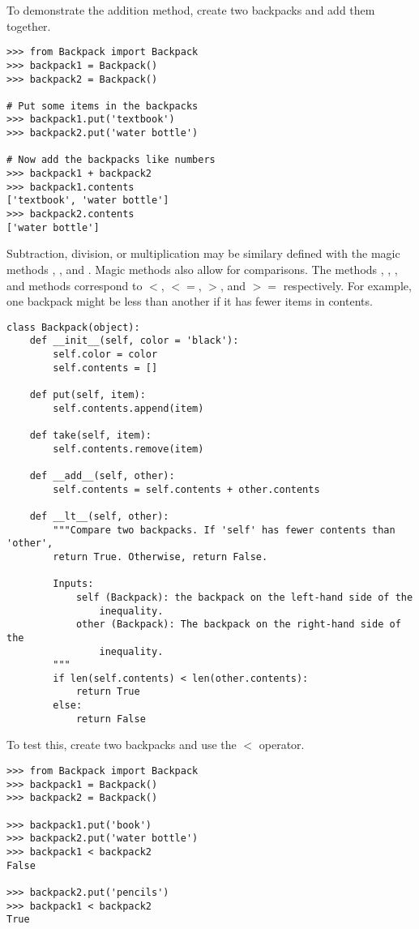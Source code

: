 To demonstrate the addition method, create two backpacks and add them together.

\begin{lstlisting}
>>> from Backpack import Backpack
>>> backpack1 = Backpack()
>>> backpack2 = Backpack()

# Put some items in the backpacks
>>> backpack1.put('textbook')
>>> backpack2.put('water bottle')

# Now add the backpacks like numbers
>>> backpack1 + backpack2
>>> backpack1.contents
['textbook', 'water bottle']
>>> backpack2.contents
['water bottle']
\end{lstlisting}

Subtraction, division, or multiplication may be similary defined with the magic methods , , and .
Magic methods also allow for comparisons.
The methods , , , and  methods correspond to $<$, $<=$, $>$, and $>=$ respectively.
For example, one backpack might be less than another if it has fewer items in contents.

\begin{lstlisting}
class Backpack(object):
    def __init__(self, color = 'black'):
        self.color = color
        self.contents = []
    
    def put(self, item):
        self.contents.append(item)
    
    def take(self, item):
        self.contents.remove(item)

    def __add__(self, other):
        self.contents = self.contents + other.contents

    def __lt__(self, other):
        """Compare two backpacks. If 'self' has fewer contents than 'other',
        return True. Otherwise, return False.
        
        Inputs:
            self (Backpack): the backpack on the left-hand side of the
                inequality.
            other (Backpack): The backpack on the right-hand side of the
                inequality.
        """
        if len(self.contents) < len(other.contents):
            return True
        else:
            return False
\end{lstlisting}

To test this, create two backpacks and use the $<$ operator.
\begin{lstlisting}
>>> from Backpack import Backpack
>>> backpack1 = Backpack()
>>> backpack2 = Backpack()

>>> backpack1.put('book')
>>> backpack2.put('water bottle')
>>> backpack1 < backpack2
False

>>> backpack2.put('pencils')
>>> backpack1 < backpack2
True
\end{lstlisting}

